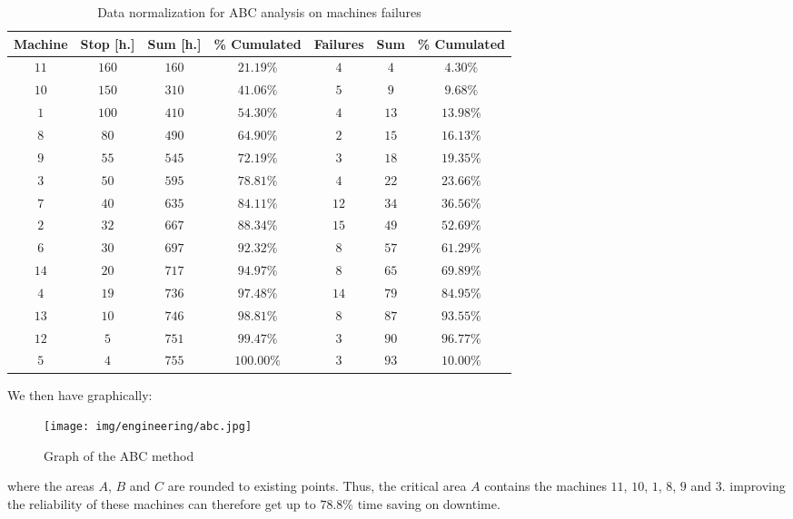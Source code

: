 	\begin{table}[H]\centering
	\begin{center}
			\begin{tabular}{|c|c|c|c||c|c|c|}
				\hline
				\multicolumn{1}{c}{\cellcolor{black!30}\textbf{Machine}} & 
  \multicolumn{1}{c}{\cellcolor{black!30}\textbf{Stop [h.]}} & 
  \multicolumn{1}{c}{\cellcolor{black!30}\textbf{Sum [h.]}} & 
  \multicolumn{1}{c}{\cellcolor{black!30}\textbf{\% Cumulated}} & 
  \multicolumn{1}{c}{\cellcolor{black!30}\textbf{Failures}} & 
  \multicolumn{1}{c}{\cellcolor{black!30}\textbf{Sum}}& 
  \multicolumn{1}{c}{\cellcolor{black!30}\textbf{\% Cumulated}} \\ \hline
				 $11$ & $160$ & $160$  & $21.19\%$ & $4$ & $4$ & $4.30\%$\\ \hline
				$10$ & $150$ & $310$ & $41.06\%$ & $5$ & $9$ & $9.68\%$\\ \hline
				$1$ & $100$ & $410$ & $54.30\%$ & $4$ & $13$ & $13.98\%$\\ \hline
				$8$ & $80$ & $490$ & $64.90\%$ & $2$ & $15$ & $16.13\%$\\ \hline
				$9$ & $55$ & $545$ & $72.19\%$ & $3$ & $18$ & $19.35\%$\\ \hline
				$3$ & $50$ & $595$ & $78.81\%$ & $4$ & $22$ & $23.66\%$\\ \hline
				$7$ & $40$ & $635$ & $84.11\%$ & $12$ & $34$ & $36.56\%$\\ \hline
				$2$ & $32$ & $667$ & $88.34\%$ & $15$ & $49$ & $52.69\%$\\ \hline
				$6$ & $30$ & $697$ & $92.32\%$ & $8$ & $57$ & $61.29\%$\\ \hline
				$14$ & $20$ & $717$ & $94.97\%$ & $8$ & $65$ & $69.89\%$\\ \hline
				$4$ & $19$ & $736$ & $97.48\%$ & $14$ & $79$ & $84.95\%$\\ \hline
				$13$ & $10$ & $746$ & $98.81\%$ & $8$ & $87$ & $93.55\%$\\ \hline
				$12$ & $5$ & $751$ & $99.47\%$ & $3$ & $90$ & $96.77\%$\\ \hline
				$5$ & $4$ & $755$ & $100.00\%$ & $3$ & $93$ & $10.00\%$\\ \hline
		\end{tabular}
	\end{center}
	\caption[]{Data normalization for ABC analysis on machines failures}
	\end{table}
	We then have graphically:
	\begin{figure}[H]
		\begin{center}
		\texttt{[image: img/engineering/abc.jpg]}
		\end{center}	
		\caption{Graph of the ABC method}
	\end{figure}
	where the areas $A$, $B$ and $C$ are rounded to existing points. Thus, the critical area $A$ contains the machines $11$, $10$, $1$, $8$, $9$ and $3$. improving the reliability of these machines can therefore get up to $78.8\%$ time saving on downtime.
	
